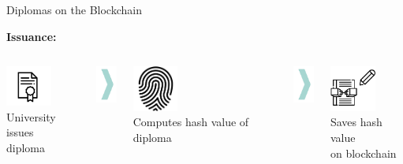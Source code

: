 \documentclass[handout]{beamer}
\begin{document}
\begin{frame}{Diplomas on the Blockchain}
	\begin{minipage}{\linewidth}
		\textbf{\large{Issuance:}}
			\begin{columns}
			\begin{column}{0.3\textwidth}
				\centering
				\includegraphics[width=1.5cm]{../assets/images/diploma.png}\\
				University issues\\
				diploma
				\end{column}
			\begin{column}{0.05\textwidth}
				\includegraphics[width=0.75cm]{../assets/images/big_arrow.png}
			\end{column}
			\begin{column}{0.3\textwidth}
				\centering
				\includegraphics[width=1.5cm]{../assets/images/fingerprint.png}\\
				Computes hash value of diploma
			\end{column}
			\begin{column}{0.05\textwidth}
				\includegraphics[width=0.75cm]{../assets/images/big_arrow.png}
			\end{column}
			\begin{column}{0.3\textwidth}
				\centering
				\includegraphics[width=1.5cm]{../assets/images/write_onchain.png}\\
				Saves hash value\\ on blockchain
			\end{column}
		\end{columns}

\end{minipage}
\end{frame}
\end{document}
